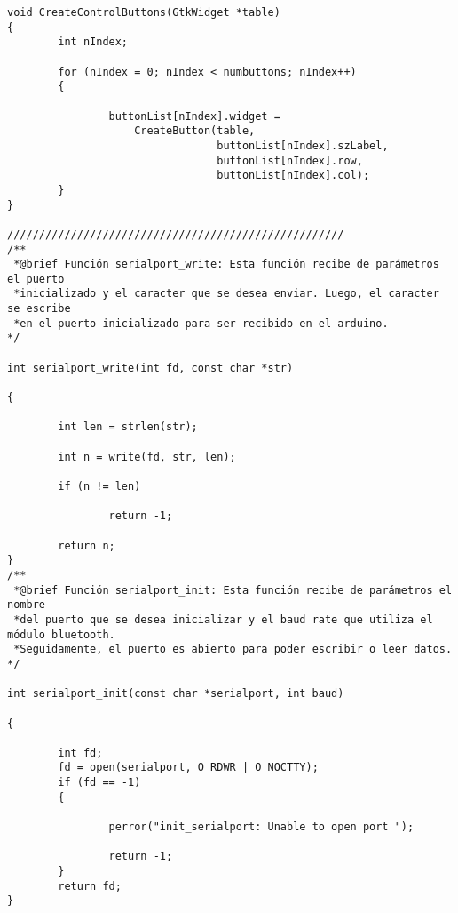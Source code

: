 \begin{lstlisting}
void CreateControlButtons(GtkWidget *table)
{
        int nIndex;

        for (nIndex = 0; nIndex < numbuttons; nIndex++)
        {

                buttonList[nIndex].widget =
                    CreateButton(table,
                                 buttonList[nIndex].szLabel,
                                 buttonList[nIndex].row,
                                 buttonList[nIndex].col);
        }
}

/////////////////////////////////////////////////////
/**
 *@brief Función serialport_write: Esta función recibe de parámetros el puerto
 *inicializado y el caracter que se desea enviar. Luego, el caracter se escribe
 *en el puerto inicializado para ser recibido en el arduino.
*/

int serialport_write(int fd, const char *str)

{

        int len = strlen(str);

        int n = write(fd, str, len);

        if (n != len)

                return -1;

        return n;
}
/**
 *@brief Función serialport_init: Esta función recibe de parámetros el nombre
 *del puerto que se desea inicializar y el baud rate que utiliza el módulo bluetooth.
 *Seguidamente, el puerto es abierto para poder escribir o leer datos.
*/

int serialport_init(const char *serialport, int baud)

{

        int fd;
        fd = open(serialport, O_RDWR | O_NOCTTY);
        if (fd == -1)
        {

                perror("init_serialport: Unable to open port ");

                return -1;
        }
        return fd;
}


\end{lstlisting}
\newpage
